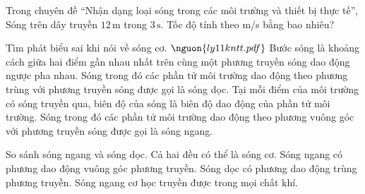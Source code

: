 \begin{ex}
Trong chuyên đề “Nhận dạng loại sóng trong các môi trường và thiết bị thực tế”, Sóng trên dây truyền $12\,\text{m}$ trong $3\,\text{s}$. Tốc độ tính theo m/s bằng bao nhiêu?
\end{ex}

\begin{ex}
Tìm phát biểu sai khi nói về sóng cơ. $\nguon{ly11 kntt.pdf}$
\choice
{\True Bước sóng là khoảng cách giữa hai điểm gần nhau nhất trên cùng một phương truyền sóng dao động ngược pha nhau.}
{Sóng trong đó các phần tử môi trường dao động theo phương trùng với phương truyền sóng được gọi là sóng dọc.}
{Tại mỗi điểm của môi trường có sóng truyền qua, biên độ của sóng là biên độ dao động của phần tử môi trường.}
{Sóng trong đó các phần tử môi trường dao động theo phương vuông góc với phương truyền sóng được gọi là sóng ngang.}
\end{ex}

\begin{ex}
So sánh sóng ngang và sóng dọc.
\choiceTF
{\True Cả hai đều có thể là sóng cơ.}
{\True Sóng ngang có phương dao động vuông góc phương truyền.}
{\True Sóng dọc có phương dao động trùng phương truyền.}
{Sóng ngang cơ học truyền được trong mọi chất khí.}
\end{ex}

